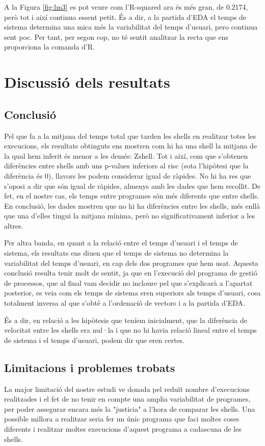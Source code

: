 \documentclass[12pt]{article}
\begin{document}
A la Figura \ref{fig:lm3} es pot veure com l'R-squared ara és més gran, de 0.2174, però tot i així continua essent petit. És a dir, a la
partida d'EDA el temps de sistema determina una mica més la variabilitat del temps d'usuari, pero continua sent poc. Per tant, per segon cop,
no té sentit analitzar la recta que ens proporciona la comanda d'R.

\section{Discussió dels resultats}
\subsection{Conclusió}
Pel que fa a la mitjana del temps total que tarden les shells en realitzar totes les execucions, els resultats obtinguts ens mostren com hi ha una shell la mitjana 
de la qual hem inferit és menor a les demés: Zshell. Tot i així, com que s'obtenen diferències entre shells amb uns p-values inferiors al risc (sota l'hipòtesi que la
diferència és 0), llavors les podem considerar igual de ràpides. No hi ha res que s'oposi a dir que són igual de ràpides, almenys amb les dades que hem recollit. De fet, en el 
nostre cas, els temps entre programes són més diferents que entre shells. En conclusió, les dades mostren que no hi ha diferències entre les shells, més enllà que una d'elles
tingui la mitjana mínima, però no significativament inferior a les altres. \break

Per altra banda, en quant a la relació entre el temps d'usuari i el temps de sistema, els resultats ens diuen que el temps de sistema no determina la variabilitat 
del temps d'usuari, en cap dels dos programes que hem usat. Aquesta conclusió resulta tenir molt de sentit, ja que en l'execució del programa de gestió de processos, que 
al final vam decidir no incloure pel que s'explicarà a l'apartat posterior, es veia com els temps de sistema eren superiors als temps d'usuari, cosa totalment inversa al que 
s'obté a l'ordenació de vectors i a la partida d'EDA.

És a dir, en relació a les hipòtesis que teníem inicialment, que la diferència de velocitat entre les shells era nul·la i que no hi havia relació lineal entre el temps de sistema
i el temps d'usuari, podem dir que eren certes.

\subsection{Limitacions i problemes trobats}
La major limitació del nostre estudi ve donada pel reduït nombre d'execucions realitzades i el fet de no tenir en compte una amplia variabilitat de programes, per poder assegurar
encara més la "justicia" a l'hora de comparar les shells. Una possible millora a realitzar seria fer un únic programa que faci moltes coses diferents i realitzar moltes execucions
d'aquest programa a cadascuna de les shells.
\end{document}
